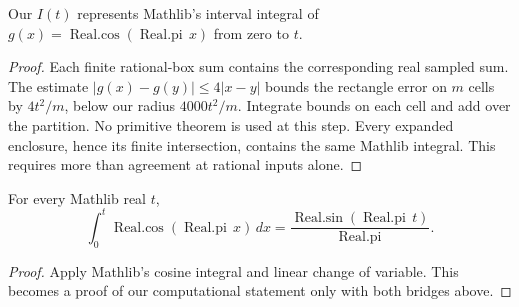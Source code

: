 \begin{lemma}\label{lem:c3-quadrature}
\leanok
Our $I(t)$ represents Mathlib's interval integral of
$g(x)=\operatorname{Real.cos}(\operatorname{Real.pi}\,x)$ from zero to $t$.
\end{lemma}
\begin{proof}\leanok
Each finite rational-box sum contains the corresponding real sampled sum.
The estimate $|g(x)-g(y)|\le4|x-y|$ bounds the rectangle error on $m$ cells
by $4t^2/m$, below our radius $4000t^2/m$. Integrate bounds on each cell
and add over the partition. No primitive theorem is used at this step.
Every expanded enclosure, hence its finite intersection, contains the same
Mathlib integral. This requires more than agreement at rational inputs alone.
\end{proof}

\begin{lemma}\label{lem:c3-mftc}
\leanok
For every Mathlib real $t$,
\[
 \int_0^t\operatorname{Real.cos}(\operatorname{Real.pi}\,x)\,dx
 =\frac{\operatorname{Real.sin}(\operatorname{Real.pi}\,t)}{\operatorname{Real.pi}}.
\]
\end{lemma}
\begin{proof}\leanok
Apply Mathlib's cosine integral and linear change of variable. This becomes
a proof of our computational statement only with both bridges above.
\end{proof}

